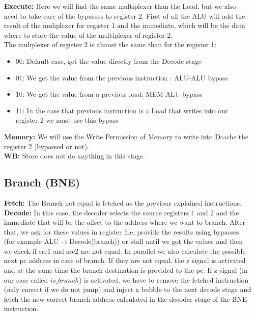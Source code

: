 \documentclass{article}
\begin{document}
\textbf{Execute:}
Here we will find the same multiplexer than the Load, but we also need to take care of the bypasses to register 2. First of all the ALU will add the result of the muliplexer for register 1 and the immediate, which will be the data where to store the value of the multiplexer of register 2.\\
The muliplexer of register 2 is almost the same than for the register 1:\\
\begin{itemize}
\item 00: Default case, get the value directly from the Decode stage
\item 01: We get the value from the previous instruction : ALU-ALU bypass
\item 10: We get the value from a previous load: MEM-ALU bypass
\item 11: In the case that previous instruction is a Load that writes into our register 2 we must use this bypass
\end{itemize}

\textbf{Memory:}
We will use the Write Permission of Memory to write into Dcache the register 2 (bypassed or not).\\

\textbf{WB:}
Store does not do anything in this stage.

\subsection{Branch (BNE)}
\textbf{Fetch:} The Branch not equal is fetched as the previous explained instructions.\\

\textbf{Decode:} In this case, the decoder selects the source registers 1 and 2 and the immediate that will be the offset to the address where we want to branch. After that, we ask for these values in register file, provide the results using bypasses (for example ALU$\rightarrow$Decode(branch)) or stall until we got the values and then we check if src1 and src2 are not equal. In parallel we also calculate the possible next pc address in case of branch. If they are not equal, the z signal is activated and at the same time the branch destination is provided to the pc. If z signal (in our case called $is\_branch$) is activated, we have to remove the fetched instruction (only correct if we do not jump) and inject a bubble to the next decode stage and fetch the new correct branch address calculated in the decoder stage of the BNE instruction.\\
\end{document}
